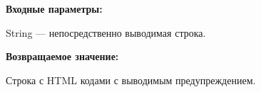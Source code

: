 \textbf{Входные параметры:}

String --- непосредственно выводимая строка.

\textbf{Возвращаемое значение:}

Строка с HTML кодами с выводимым предупреждением.